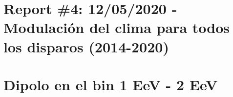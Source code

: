 \section{Report \#4: 12/05/2020 - Modulación del clima para todos los disparos (2014-2020)}
\graphicspath{{report_4_12_05_2020/}}


% 

\section{Dipolo en el bin 1 EeV - 2 EeV}
\graphicspath{{report_6_02_06_2020/}}




% 






